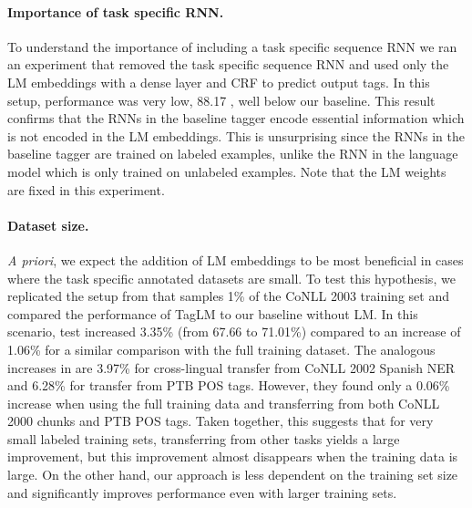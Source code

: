 \documentclass[11pt,a4paper]{article}
\begin{document}
\paragraph{Importance of task specific RNN.}
To understand the importance of including a task specific sequence RNN
we ran an experiment that removed the task specific sequence RNN and used only the LM embeddings with a dense layer and CRF to predict output tags.  In this setup, performance was very low, 88.17 , well below our baseline.
This result confirms that the RNNs in the baseline tagger encode essential information which is not encoded in the LM embeddings.
This is unsurprising since the RNNs in the baseline tagger are trained on labeled examples, unlike the RNN in the language model which is only trained on unlabeled examples.
Note that the LM weights are fixed in this experiment.

\paragraph{Dataset size.} \textit{A priori}, we expect the addition of LM embeddings to be most beneficial in cases
where the task specific annotated datasets are small.  To test this hypothesis, we replicated the setup from \citet{yang-transfer-iclr07}
that samples 1\% of the CoNLL 2003 training set and compared the performance of TagLM to our baseline without LM.
In this scenario, test  increased 3.35\% (from 67.66 to 71.01\%) compared to an increase of 1.06\%  for a similar comparison
with the full training dataset.  The analogous increases in \citet{yang-transfer-iclr07} are 3.97\% for cross-lingual
transfer from CoNLL 2002 Spanish NER and 6.28\%  for transfer from PTB POS tags.  However, they found only a 0.06\% 
increase when using the full training data and transferring from both CoNLL 2000 chunks and PTB POS tags.
Taken together, this suggests that for very small labeled training sets, transferring from other tasks yields a large improvement, but this improvement almost disappears when the training data is large.
On the other hand, our approach is less dependent on the training set size and significantly improves performance even with larger training sets.
\end{document}
